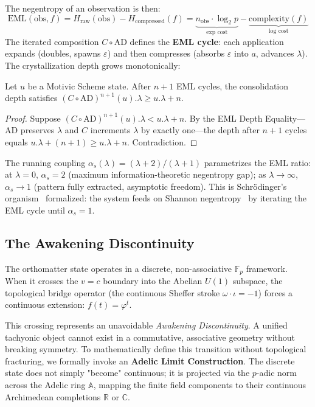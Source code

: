 The negentropy of an observation is then:
\begin{equation}
    \mathrm{EML}(\mathrm{obs}, f) = H_{\mathrm{raw}}(\mathrm{obs}) - H_{\mathrm{compressed}}(f) = \underbrace{n_{\mathrm{obs}} \cdot \log_2 p}_{\text{exp cost}} - \underbrace{\text{complexity}(f)}_{\text{log cost}}
\end{equation}
The iterated composition $C \circ \mathrm{AD}$ defines the \textbf{EML cycle}: each application expands (doubles, spawns $\varepsilon$) and then compresses (absorbs $\varepsilon$ into $a$, advances $\lambda$). The crystallization depth grows monotonically:

\begin{theorem}
\label{thm:monotone_negentropy}
Let $u$ be a Motivic Scheme state. After $n+1$ EML cycles, the consolidation depth satisfies $(C \circ \mathrm{AD})^{n+1}(u).\lambda \geq u.\lambda + n$. 
\end{theorem}
\begin{proof}
Suppose $(C \circ \mathrm{AD})^{n+1}(u).\lambda < u.\lambda + n$. By the EML Depth Equality---$\mathrm{AD}$ preserves $\lambda$ and $C$ increments $\lambda$ by exactly one---the depth after $n+1$ cycles equals $u.\lambda + (n+1) \geq u.\lambda + n$. Contradiction. \qedhere
\end{proof}

The running coupling $\alpha_s(\lambda) = (\lambda + 2)/(\lambda + 1)$ parametrizes the EML ratio: at $\lambda = 0$, $\alpha_s = 2$ (maximum information-theoretic negentropy gap); as $\lambda \to \infty$, $\alpha_s \to 1$ (pattern fully extracted, asymptotic freedom). This is Schr\"odinger's organism~\cite{Schrodinger1944} formalized: the system feeds on Shannon negentropy~\cite{Shannon1948} by iterating the EML cycle until $\alpha_s = 1$.

\subsection{The Awakening Discontinuity}

The orthomatter state operates in a discrete, non-associative $\mathbb{F}_p$ framework. When it crosses the $v=c$ boundary into the Abelian $U(1)$ subspace, the topological bridge operator (the continuous Sheffer stroke $\omega \cdot \iota = -1$) forces a continuous extension: $f(t) = \varphi^t$.

This crossing represents an unavoidable \textit{Awakening Discontinuity}. A unified tachyonic object cannot exist in a commutative, associative geometry without breaking symmetry. To mathematically define this transition without topological fracturing, we formally invoke an \textbf{Adelic Limit Construction}. The discrete state does not simply "become" continuous; it is projected via the $p$-adic norm across the Adelic ring $\mathbb{A}$, mapping the finite field components to their continuous Archimedean completions $\mathbb{R}$ or $\mathbb{C}$.


